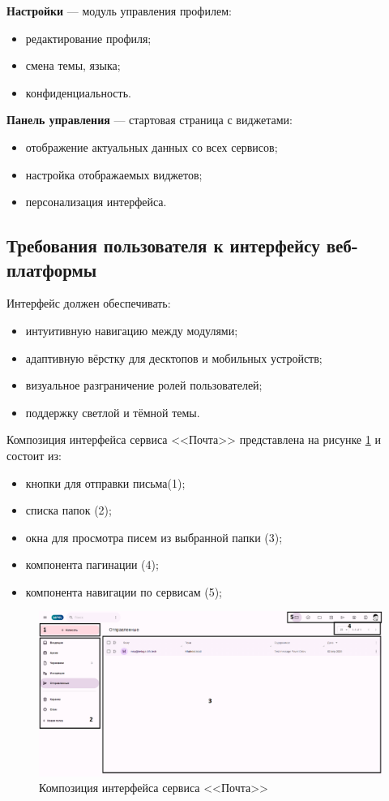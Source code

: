   \textbf{Настройки} — модуль управления профилем:
  \begin{itemize}
    \item редактирование профиля;
    \item смена темы, языка;
    \item конфиденциальность.
  \end{itemize}

  \textbf{Панель управления} — стартовая страница с виджетами:
  \begin{itemize}
    \item отображение актуальных данных со всех сервисов;
    \item настройка отображаемых виджетов;
    \item персонализация интерфейса.
  \end{itemize}

\subsection{Требования пользователя к интерфейсу веб-платформы}

Интерфейс должен обеспечивать:
\begin{itemize}
  \item интуитивную навигацию между модулями;
  \item адаптивную вёрстку для десктопов и мобильных устройств;
  \item визуальное разграничение ролей пользователей;
  \item поддержку светлой и тёмной темы.
\end{itemize}

Композиция интерфейса сервиса <<Почта>> представлена на рисунке \ref{templ:image1} и состоит из:
\begin{itemize}
  \item кнопки для отправки письма(1);
  \item списка папок (2);
  \item окна для просмотра писем из выбранной папки (3);
  \item компонента пагинации (4);
  \item компонента навигации по сервисам (5);
\end{itemize}
\begin{figure}[H]
	\centering
	\includegraphics[width=1\linewidth]{images/почта}
	\caption{Композиция интерфейса сервиса <<Почта>>}
	\label{templ:image1}
\end{figure}

